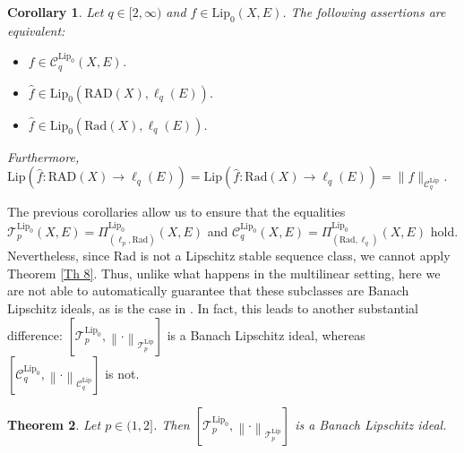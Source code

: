\documentclass[12pt]{amsart}
\newtheorem{theorem}{Theorem}[section]
\newtheorem{corollary}[theorem]{Corollary}
\def\C{\mathcal{C}}
\def\T{\mathcal{T}}
\def\C{\mathcal{C}}
\def\Lip{\mathrm{Lip}_0}
\def\Lipnorm{\mathrm{Lip}}
\def\Rad{\mathrm{Rad}}
\def\RAD{\mathrm{RAD}}
\begin{document}
\begin{corollary}\label{Cor 2.7}
	Let $q\in[2,\infty)$ and $f \in \Lip(X,E)$. The following assertions are equivalent:
	\begin{itemize}
		\item[$(i)$] $f \in \C_q^{\Lip}(X,E)$.
		\item[$(ii)$] $\hat{f} \in\Lip(\RAD(X),\ell_q(E))$.
		\item[$(iii)$] $\hat{f} \in \Lip(\Rad(X),\ell_q(E))$.
	\end{itemize}

	Furthermore, $\Lipnorm(\hat{f}:\RAD(X) \to \ell_q(E)) = \Lipnorm(\hat{f}:\Rad(X) \to \ell_q(E)) = \|f\|_{\C_q^{\Lipnorm}}$.
	\end{corollary}

The previous corollaries allow us to ensure that the equalities $\T_p^{\Lip}(X,E) = \Pi_{(\ell_p,\Rad)}^{\Lip}(X,E)$ and $\C_q^{\Lip}(X,E) = \Pi_{(\Rad,\ell_q)}^{\Lip}(X,E)$ hold. Nevertheless, since $\Rad$ is not a Lipschitz stable sequence class, we cannot apply Theorem \ref{Th 8}. Thus, unlike what happens in the multilinear setting, here we are not able to automatically guarantee that these subclasses are Banach Lipschitz ideals, as is the case in \cite[Theorem 3.7]{BotCam-16}. In fact, this leads to another substantial difference: $[\T_p^{\Lip},\left\|\cdot\right\|_{\T_p^{\Lipnorm}}]$ is a Banach Lipschitz ideal, whereas $[\C_q^{\Lip},\left\|\cdot\right\|_{\C_q^{\Lipnorm}}]$ is not.

\begin{theorem}\label{Cor 2.8}
	Let $p\in(1,2]$. Then $[\T_p^{\Lip},\left\|\cdot\right\|_{\T_p^{\Lipnorm}}]$ is a Banach Lipschitz ideal.
\end{theorem}
\end{document}
